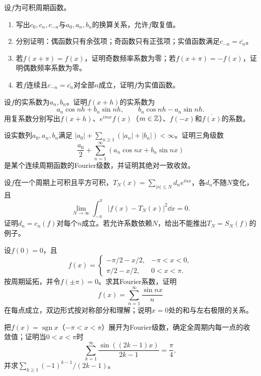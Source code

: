 设$f$为可积周期函数。
\begin{enumerate}[label=(\arabic*)]
\item 写出$c_0,c_n,c_{-n}$与$a_0,a_n,b_n$的换算关系，允许$f$取复值。
\item 分别证明：偶函数只有余弦项；奇函数只有正弦项；实值函数满足$c_{-n}=\overline{c_n}$。
\item 若$f(x+\pi)=f(x)$，证明奇数频率系数为零；若$f(x+\pi)=-f(x)$，证明偶数频率系数为零。
\item 若$f$连续且$c_{-n}=\overline{c_n}$对全部$n$成立，证明$f$为实值函数。
\end{enumerate}

设$f$的实系数为$a_n,b_n$。证明$f(x+h)$的实系数为
\[
 a_n\cos nh+b_n\sin nh,\qquad b_n\cos nh-a_n\sin nh.
\]
用复系数分别写出$f(x+h)$、$e^{imx}f(x)$（$m\in\mathbb Z$）、$f(-x)$和$\overline{f(x)}$的系数。

设实数列$a_0,a_n,b_n$满足
$|a_0|+\sum_{n\ge1}(|a_n|+|b_n|)<\infty$。证明三角级数
\[
 \frac{a_0}2+\sum_{n=1}^{\infty}(a_n\cos nx+b_n\sin nx)
\]
是某个连续周期函数的Fourier级数，并证明其绝对一致收敛。

设$f$在一个周期上可积且平方可积，$T_N(x)=\sum_{|n|\le N}d_ne^{inx}$，各$d_n$不随$N$变化，且
\[
 \lim_{N\to\infty}\int_{-\pi}^{\pi}|f(x)-T_N(x)|^2\dd x=0.
\]
证明$d_n=c_n(f)$对每个$n$成立。若允许系数依赖$N$，给出不能推出$T_N=S_N(f)$的例子。

设$f(0)=0$，且
\[
 f(x)=\begin{cases}-\pi/2-x/2,&-\pi<x<0,\\\pi/2-x/2,&0<x<\pi.\end{cases}
\]
按周期延拓，并令$f(\pm\pi)=0$。求其Fourier系数，证明
\[
 f(x)=\sum_{n=1}^{\infty}\frac{\sin nx}{n}
\]
在每点成立，双边形式按对称部分和理解；说明$x=0$处的和与左右极限的关系。

把$f(x)=\operatorname{sgn}x$（$-\pi<x<\pi$）展开为Fourier级数，确定全周期内每一点的收敛值；证明当$0<x<\pi$时
\[
 \sum_{k=1}^{\infty}\frac{\sin((2k-1)x)}{2k-1}=\frac\pi4,
\]
并求$\sum_{k\ge1}(-1)^{k-1}/(2k-1)$。

